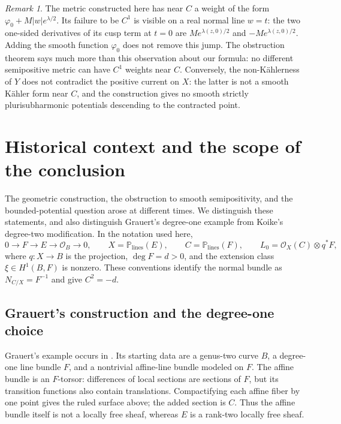 \documentclass[11pt,a4paper]{article}
\numberwithin{equation}{section}
\theoremstyle{definition}
\theoremstyle{remark}
\newtheorem{remark}[theorem]{Remark}
\begin{document}
\begin{remark}\label{con:regularity-meaning}
The metric constructed here has near $C$ a weight of the form
$\varphi_0+M|w|e^{\lambda/2}$. Its failure to be $C^1$ is visible
on a real normal line $w=t$: the two one-sided derivatives of its
cusp term at $t=0$ are $Me^{\lambda(z,0)/2}$ and
$-Me^{\lambda(z,0)/2}$. Adding the smooth function $\varphi_0$
does not remove this jump. The obstruction theorem says much
more than this observation about our formula: no different
semipositive metric can have $C^1$ weights near $C$.
Conversely, the non-K\"ahlerness of $Y$ does not contradict the
positive current on $X$: the latter is not a smooth K\"ahler
form near $C$, and the construction gives no smooth strictly
plurisubharmonic potentials descending to the contracted point.
\end{remark}

\section{Historical context and the scope of the conclusion}
\label{hist:context}

The geometric construction, the obstruction to smooth semipositivity, and the
bounded-potential question arose at different times.  We distinguish these
statements, and also distinguish Grauert's degree-one example from Koike's
degree-two modification.  In the notation used here,
\[
  0\longrightarrow F\longrightarrow E\longrightarrow\mathcal O_B
     \longrightarrow0,\qquad
  X=\mathbb P_{\mathrm{lines}}(E),\qquad C=\mathbb P_{\mathrm{lines}}(F),
  \qquad L_0=\mathcal O_X(C)\otimes q^*F,
\]
where $q:X\to B$ is the projection, $\deg F=d>0$, and the extension class
$\xi\in H^1(B,F)$ is nonzero.  These conventions identify the normal bundle
as $N_{C/X}=F^{-1}$ and give $C^2=-d$.

\subsection{Grauert's construction and the degree-one choice}
\label{hist:grauert}

Grauert's example occurs in \cite[\S4, paragraph~8(d), pp.~365--366]{Grauert1962}.
Its starting data are a genus-two curve $B$, a degree-one line bundle $F$, and
a nontrivial affine-line bundle modeled on $F$.  The affine bundle is an
$F$-torsor: differences of local sections are sections of $F$, but its
transition functions also contain translations.  Compactifying each affine
fiber by one point gives the ruled surface above; the added section is $C$.
Thus the affine bundle itself is not a locally free sheaf, whereas $E$ is a
rank-two locally free sheaf.
\end{document}
